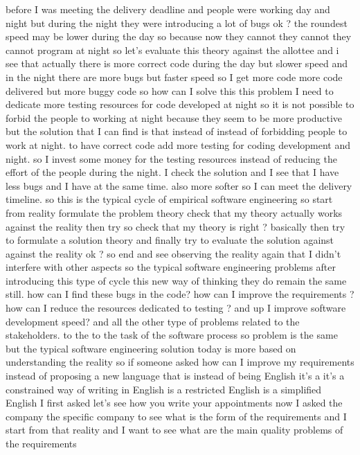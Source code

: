 \documentclass[conference, compsoc, twoside]{IEEEtran}
\begin{document}
 before I was meeting the delivery deadline and people were working day and night but during the night they were introducing a lot of bugs ok ? the roundest speed may be lower during the day so because now they cannot they cannot they cannot program at night so let's evaluate this theory against the allottee and i see that actually there is more correct code during the day but slower speed and in the night there are more bugs but faster speed 
so I get more code more code delivered but more buggy code so how can I solve this this problem I need to dedicate more testing resources for code developed at night so it is not possible to forbid the people to working at night because they seem to be more productive but the solution that I can find is that instead of instead of forbidding people to work at night. to have correct code add more testing for coding development and night. 
so I invest some money for the testing resources instead of reducing the effort of the people during the night.
I check the solution and I see that I have less bugs and I have at the same time. also more softer so I can meet the delivery timeline.
so this is the typical cycle of empirical software engineering so start from reality formulate the problem theory check that my theory actually works against the reality then try so check that my theory is right ? 
basically then try to formulate a solution theory and finally try to evaluate the solution against against the reality ok ? so end and see observing the reality again that I didn't interfere with other aspects so the typical software engineering problems after introducing this type of cycle this new way of thinking they do remain the same still. 
how can I find these bugs in the code?
 how can I improve the requirements ?
 how can I reduce the resources dedicated to testing ? 
 and up I improve software development speed? and all the other type of problems related to the stakeholders.
  to the to the task of the software process so problem is the same but the typical software engineering solution today is more based on understanding the reality so if someone asked how can I improve my requirements instead of proposing a new language that is instead of being English it's a it's a constrained way of writing in English is a restricted English is a simplified English I first asked let's see how you write your appointments now I asked the company the specific company to see what is the form of the requirements and I start from that reality and I want to see what are the main quality problems of the requirements 
\end{document}
